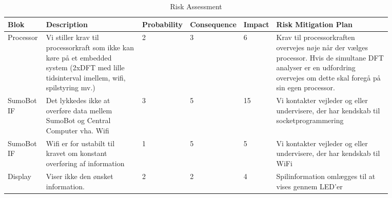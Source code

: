 \begin{landscape}
\begin{table}[]
\caption{Risk Assessment}
\label{Table:Risk_Assessment}
\centering
\small
\begin{tabular}{
p{0.1\linewidth} %
p{0.25\linewidth} %
p{0.08\linewidth} %
p{0.09\linewidth} %
p{0.05\linewidth} %
p{0.3\linewidth} %
}
\textbf{Blok}& \textbf{Description}& \textbf{Probability} & \textbf{Consequence} & \textbf{Impact} & \textbf{Risk Mitigation Plan}                                                                                                                                                        \\\midrule
Processor        & Vi stiller krav til   processorkraft som ikke kan køre på et embedded system (2xDFT med lille   tidsinterval imellem, wifi, spilstyring mv.) & 2           & 3           & 6      & Krav til processorkraften   overvejes nøje når der vælges processor. Hvis de simultane DFT analyser er en   udfordring overvejes om dette skal foregå på sin egen processor. \\\cmidrule(lr){1-6}
SumoBot IF       & Det lykkedes ikke at overføre   data mellem SumoBot og Central Computer vha. Wifi                                                            & 3           & 5           & 15     & Vi kontakter vejleder og eller   undervisere, der har kendskab til socketprogrammering                                                                                       \\\cmidrule(lr){1-6}
SumoBot IF       & Wifi er for ustabilt til kravet   om konstant overføring af information                                                                      & 1           & 5           & 5      & Vi kontakter vejleder og eller   undervisere, der har kendskab til WiFi                                                                                                      \\\cmidrule(lr){1-6}
Display          & Viser ikke den ønsket   information.                                                                                                         & 2           & 2           & 4      & Spilinformation omlægges til at   vises gennem LED'er                                                                                                                        \\\cmidrule(lr){1-6}

\end{tabular}
\end{table}
\end{landscape}
